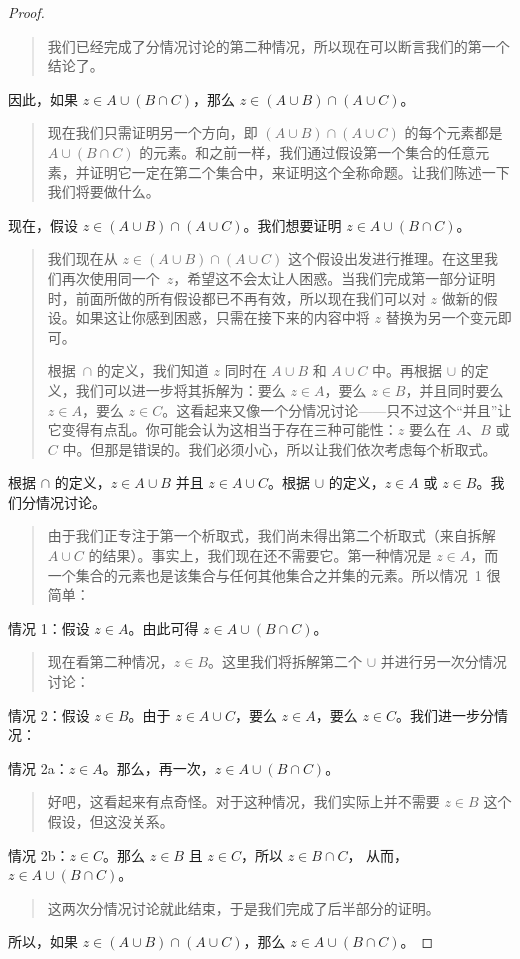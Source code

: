 \documentclass[../../../include/open-logic-section]{subfiles}
\begin{document}
\begin{proof}
\begin{quote}
我们已经完成了分情况讨论的第二种情况，所以现在可以断言我们的第一个结论了。
\end{quote}
因此，如果 $z \in A \cup (B \cap C)$，那么 $z \in (A \cup B) \cap (A \cup C)$。
\begin{quote}
现在我们只需证明另一个方向，即 $(A \cup B) \cap (A \cup C)$ 的每个元素都是 $A \cup (B \cap
C)$ 的元素。和之前一样，我们通过假设第一个集合的任意元素，并证明它一定在第二个集合中，来证明这个全称命题。让我们陈述一下我们将要做什么。
\end{quote}
现在，假设 $z \in (A \cup B) \cap (A \cup C)$。我们想要证明
$z \in A \cup (B \cap C)$。
\begin{quote}
我们现在从 $z \in (A \cup B) \cap (A
\cup C)$ 这个假设出发进行推理。在这里我们再次使用同一个~$z$，希望这不会太让人困惑。当我们完成第一部分证明时，前面所做的所有假设都已不再有效，所以现在我们可以对 $z$ 做新的假设。如果这让你感到困惑，只需在接下来的内容中将 $z$ 替换为另一个变元即可。

根据~$\cap$ 的定义，我们知道 $z$ 同时在 $A \cup B$ 和 $A \cup C$ 中。再根据 $\cup$ 的定义，我们可以进一步将其拆解为：要么 $z \in A$，要么 $z \in B$，并且同时要么 $z \in A$，要么 $z \in
C$。这看起来又像一个分情况讨论——只不过这个“并且”让它变得有点乱。你可能会认为这相当于存在三种可能性：$z$ 要么在 $A$、$B$ 或 $C$ 中。但那是错误的。我们必须小心，所以让我们依次考虑每个析取式。
\end{quote}
根据 $\cap$ 的定义，$z \in A \cup B$ 并且 $z \in A \cup C$。根据
$\cup$ 的定义，$z \in A$ 或 $z \in B$。我们分情况讨论。
\begin{quote}
由于我们正专注于第一个析取式，我们尚未得出第二个析取式（来自拆解 $A \cup C$ 的结果）。事实上，我们现在还不需要它。第一种情况是 $z \in A$，而一个集合的元素也是该集合与任何其他集合之并集的元素。所以情况~1 很简单：
\end{quote}
情况 1：假设 $z \in A$。由此可得 $z \in A \cup (B \cap
C)$。
\begin{quote}
现在看第二种情况，$z \in B$。这里我们将拆解第二个 $\cup$ 并进行另一次分情况讨论：
\end{quote}
情况 2：假设 $z \in B$。由于 $z \in A \cup C$，要么 $z \in A$，要么 $z \in C$。我们进一步分情况：

情况 2a：$z \in A$。那么，再一次，$z \in A \cup (B \cap C)$。
\begin{quote}
好吧，这看起来有点奇怪。对于这种情况，我们实际上并不需要 $z \in B$ 这个假设，但这没关系。
\end{quote}
情况 2b：$z \in C$。那么 $z \in B$ 且 $z \in C$，所以 $z \in B \cap C$，
从而，$z \in A \cup (B \cap C)$。
\begin{quote}
这两次分情况讨论就此结束，于是我们完成了后半部分的证明。
\end{quote}
所以，如果 $z \in (A \cup B) \cap (A \cup C)$，那么 $z \in A \cup (B \cap C)$。
\end{proof}
\end{document}
